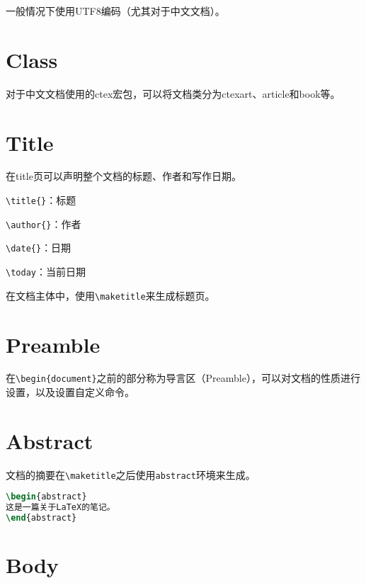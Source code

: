 一般情况下使用UTF8编码（尤其对于中文文档）。




\section{Class}




对于中文文档使用的ctex宏包，可以将文档类分为ctexart、article和book等。



\section{Title}

在title页可以声明整个文档的标题、作者和写作日期。

\begin{compactitem}
\item \texttt{\textbackslash title\{\}}：标题
\item \texttt{\textbackslash author\{\}}：作者
\item \texttt{\textbackslash date\{\}}：日期
\item \texttt{\textbackslash today}：当前日期
\end{compactitem}


在文档主体中，使用\texttt{\textbackslash maketitle}来生成标题页。

\section{Preamble}


在\texttt{\textbackslash begin\{document\}}之前的部分称为导言区（Preamble），可以对文档的性质进行设置，以及设置自定义命令。


\section{Abstract}

文档的摘要在\texttt{\textbackslash maketitle}之后使用\texttt{abstract}环境来生成。

\begin{lstlisting}[language=TeX]
\begin{abstract}
这是一篇关于LaTeX的笔记。
\end{abstract}
\end{lstlisting}


\section{Body}


